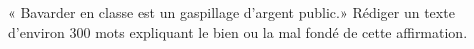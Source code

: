 
\begin{exercice}\label{exosmath-0428}

    « Bavarder en classe est un gaspillage d'argent public.» Rédiger un texte d'environ 300 mots expliquant le bien ou la mal fondé de cette affirmation.

\end{exercice}
